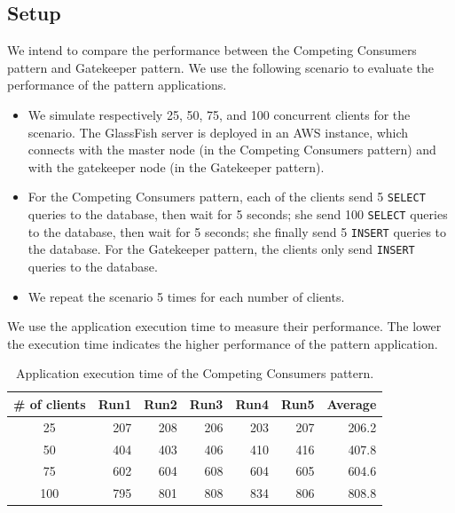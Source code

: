 \documentclass{article}
\begin{document}
\subsection{Setup}
We intend to compare the performance between the Competing Consumers pattern and Gatekeeper pattern. We use the following scenario to evaluate the performance of the pattern applications. 

\begin{itemize}
\item We simulate respectively 25, 50, 75, and 100 concurrent clients for the scenario. The GlassFish server is deployed in an AWS instance, which connects with the master node (in the Competing Consumers pattern) and with the gatekeeper node (in the Gatekeeper pattern).
\item For the Competing Consumers pattern, each of the clients send 5 \texttt{SELECT} queries to the database, then wait for 5 seconds; she send 100 \texttt{SELECT} queries to the database, then wait for 5 seconds; she finally send 5 \texttt{INSERT} queries to the database. For the Gatekeeper pattern, the clients only send \texttt{INSERT} queries to the database.
\item We repeat the scenario 5 times for each number of clients.
\end{itemize}

We use the application execution time to measure their performance. The lower the execution time indicates the higher performance of the pattern application.


\begin{table}[t]
    \centering
    \caption{Application execution time of the Competing Consumers pattern.}
    \label{tab:ccp_performance}
    \begin{tabular}{|c|r|r|r|r|r|r|}
        \hline
        \textbf{\# of clients} & \textbf{Run1} & \textbf{Run2} & \textbf{Run3} & \textbf{Run4} & \textbf{Run5} & \textbf{Average}\\ \hline
        25 & 207 & 208 & 206 & 203 & 207 & 206.2 \\ \hline 
        50 & 404 & 403 & 406 & 410 & 416 & 407.8 \\ \hline
        75 & 602 & 604 & 608 & 604 & 605 & 604.6 \\ \hline
        100 & 795 & 801 & 808 & 834 & 806 & 808.8 \\ \hline
	\end{tabular}
\end{table}
\end{document}

